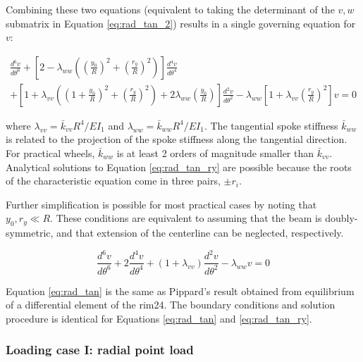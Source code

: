 \documentclass[../thesis.tex]{subfiles}
\newcommand{\dt}[2]{\frac{d^#2#1}{d\theta^#2}}
\begin{document}
Combining these two equations (equivalent to taking the determinant of the $v,w$ submatrix in Equation \eqref{eq:rad_tan_2}) results in a single governing equation for $v$:

\begin{multline}
\label{eq:rad_tan_ry}
\dt{v}{6} + \left[2-\lambda_{ww}\left(\left(\frac{y_0}{R}\right)^2 +
                                        \left(\frac{r_y}{R}\right)^2 \right) \right] \dt{v}{4}\\
          + \left[1+\lambda_{vv}\left(\left(1+\frac{y_0}{R}\right)^2+\left(\frac{r_y}{R}\right)^2\right)
                   +2\lambda_{ww}\left(\frac{y_0}{R}\right)\right]\dt{v}{2}
          - \lambda_{ww}\left[1+\lambda_{vv}\left(\frac{r_y}{R}\right)^2\right] v = 0
\end{multline}

where $\lambda_{vv}=\bar{k}_{vv}R^4/EI_1$ and $\lambda_{ww}=\bar{k}_{ww}R^4/EI_1$. The tangential spoke stiffness $\bar{k}_{ww}$ is related to the projection of the spoke stiffness along the tangential direction. For practical wheels, $\bar{k}_{ww}$ is at least 2 orders of magnitude smaller than $\bar{k}_{vv}$. Analytical solutions to Equation \eqref{eq:rad_tan_ry} are possible because the roots of the characteristic equation come in three pairs, $\pm r_i$.

Further simplification is possible for most practical cases by noting that $y_0,r_y \ll R$. These conditions are equivalent to assuming that the beam is doubly-symmetric, and that extension of the centerline can be neglected, respectively.

\begin{equation}
\label{eq:rad_tan}
\dt{v}{6} + 2\dt{v}{4}+(1+\lambda_{vv})\dt{v}{2} - \lambda_{ww}v=0
\end{equation}

Equation \eqref{eq:rad_tan} is the same as Pippard’s result obtained from equilibrium of a differential element of the rim24. The boundary conditions and solution procedure is identical for Equations \eqref{eq:rad_tan} and \eqref{eq:rad_tan_ry}.

\subsubsection{Loading case I: radial point load}
\end{document}
